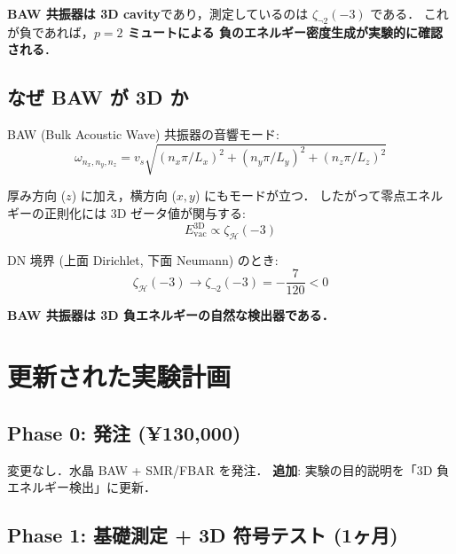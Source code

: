 \documentclass[11pt,a4paper]{article}
\begin{document}
\textbf{BAW 共振器は 3D cavity}であり，測定しているのは
$\zeta_{\neg 2}(-3)$ である．
これが負であれば，\textbf{$p=2$ ミュートによる
負のエネルギー密度生成が実験的に確認される}．

\subsection{なぜ BAW が 3D か}

BAW (Bulk Acoustic Wave) 共振器の音響モード:
\begin{equation}
  \omega_{n_x, n_y, n_z} = v_s \sqrt{(n_x \pi/L_x)^2 + (n_y \pi/L_y)^2 + (n_z \pi/L_z)^2}
\end{equation}

厚み方向 ($z$) に加え，横方向 ($x, y$) にもモードが立つ．
したがって零点エネルギーの正則化には 3D ゼータ値が関与する:
\begin{equation}
  E_{\mathrm{vac}}^{\mathrm{3D}} \propto \zeta_{\mathcal{H}}(-3)
\end{equation}

DN 境界 (上面 Dirichlet, 下面 Neumann) のとき:
\begin{equation}
  \zeta_{\mathcal{H}}(-3) \to \zeta_{\neg 2}(-3) = -\frac{7}{120} < 0
\end{equation}

\textbf{BAW 共振器は 3D 負エネルギーの自然な検出器である．}

\section{更新された実験計画}

\subsection{Phase 0: 発注 (¥130,000)}

変更なし．水晶 BAW + SMR/FBAR を発注．
\textbf{追加}: 実験の目的説明を「3D 負エネルギー検出」に更新．

\subsection{Phase 1: 基礎測定 + 3D 符号テスト (1ヶ月)}
\end{document}
